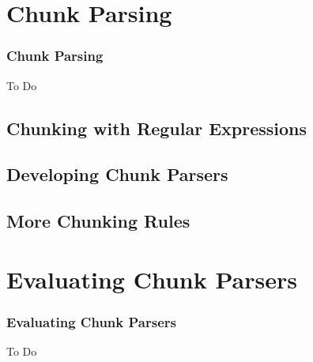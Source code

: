 \documentclass{beamer}             %
\begin{document}
\section{Chunk Parsing}

\begin{frame}
  \frametitle{Chunk Parsing}

To Do

\end{frame}

\subsection{Chunking with Regular Expressions}

\subsection{Developing Chunk Parsers}

\subsection{More Chunking Rules}

\section{Evaluating Chunk Parsers}

\begin{frame}
  \frametitle{Evaluating Chunk Parsers}

To Do

\end{frame}
\end{document}
